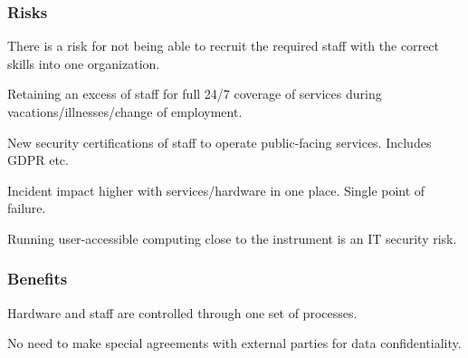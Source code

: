\documentclass[12pt,a4paper]{article}
\newcommand{\xmark}{\ding{55}}%
\newcommand{\NEG}{{\color{red!75} \xmark}}
\begin{document}
\subsubsection*{Risks}
\bitm
\item {There is a risk for \ESA not being able to recruit the required \einfra staff with the correct skills into one organization.}
\item Retaining an excess of staff for full 24/7 coverage of \ED services during vacations/illnesses/change of employment.
\item New security certifications of staff to operate public-facing services. Includes GDPR etc. 
\item Incident impact higher with services/hardware in one place. Single point of failure. %
\item Running user-accessible computing close to the instrument is an IT security risk.
\eitm

\subsubsection*{Benefits}
\bitm
\item Hardware and staff are controlled through one set of \EC processes.
\item No need to make special agreements with external parties for data confidentiality. %
\eitm
\end{document}
